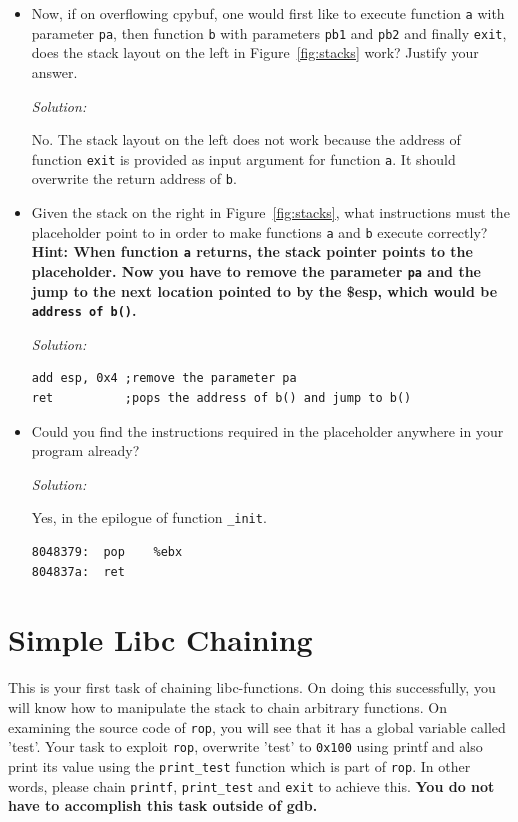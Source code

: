 \documentclass[a4paper,11pt]{article}
\newenvironment{solution}%
{\par{\noindent\small\textit{Solution:}}\vspace{-12pt}\begin{framed}}%
{\end{framed}\par}
\begin{document}
\begin {itemize}
\item Now, if on overflowing cpybuf, one would first like to execute function
\texttt{a} with parameter \texttt{pa}, then function \texttt{b} with
parameters \texttt{pb1} and \texttt{pb2}  and finally \texttt{exit}, does the
stack layout on the left in Figure~\ref{fig:stacks} work? Justify your answer.
\ifsolution\begin{solution}
No. The stack layout on the left does not work because the address of function \texttt{exit} is provided as input argument for function \texttt{a}. It should overwrite the return address of \texttt{b}.
\end{solution}\fi

\item Given the stack on the right in Figure~\ref{fig:stacks}, what instructions
  must the placeholder point to in order to make functions \texttt{a} and
  \texttt{b} execute correctly? \textbf{Hint: When function
    \texttt{a} returns, the stack pointer points to the placeholder. Now you have to
    remove the parameter \texttt{pa} and the jump to the next
    location pointed to by the \$esp, which would be \texttt{address of b()}.}
\ifsolution\begin{solution}
\begin{lstlisting}
add esp, 0x4 ;remove the parameter pa 
ret          ;pops the address of b() and jump to b()
\end{lstlisting}
\end{solution}\fi

\item Could you find the instructions required in the placeholder anywhere in your program already?
\ifsolution\begin{solution}
Yes, in the epilogue of function \texttt{\_init}.
\begin{lstlisting}
8048379:  pop    %ebx
804837a:  ret    
\end{lstlisting}
\end{solution}\fi
\end{itemize}

\section*{Simple Libc Chaining}
This is your first task of chaining libc-functions. On doing this successfully,
you will know how to manipulate the stack to chain arbitrary functions. On
examining the source code of \texttt{rop}, you will see that it has a global
variable called 'test'. Your task to exploit \texttt{rop}, overwrite 'test' to
\texttt{0x100} using printf and also print its value using the
\texttt{print\_test} function which is part of \texttt{rop}. In other words,
please chain \texttt{printf}, \texttt{print\_test} and \texttt{exit} to achieve
this. \textbf{You do not have to accomplish this task outside of gdb.}
\end{document}
